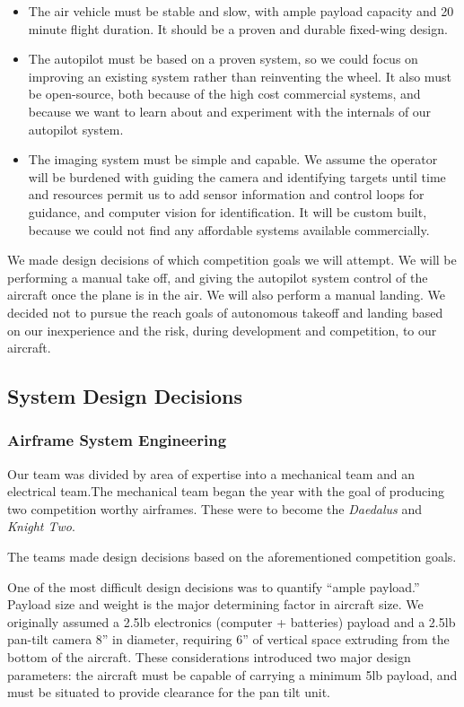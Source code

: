 \documentclass[10pt,twocolumns]{report}
\begin{document}
\begin{itemize}
	\item The air vehicle must be stable and slow, with ample payload capacity and 20 minute flight duration. It should be a proven and durable fixed-wing design.
	\item The autopilot must be based on a proven system, so we could focus on improving an existing system rather than reinventing the wheel. It also must be open-source, both because of the high cost commercial systems, and because we want to learn about and experiment with the internals of our autopilot system.
	\item The imaging system must be simple and capable. We assume the operator will be burdened with guiding the camera and identifying targets until time and resources permit us to add sensor information and control loops for guidance, and computer vision for identification. It will be custom built, because we could not find any affordable systems available commercially.
\end{itemize}

We made design decisions of which competition goals we will attempt. 
We will be performing a manual take off, and giving the autopilot system control of the aircraft once the plane is in the air. We will also perform a manual landing. We decided not to pursue the reach goals of autonomous takeoff and landing based on our inexperience and the risk, during development and competition, to our aircraft.
\subsection{System Design Decisions}
\subsubsection{Airframe System Engineering}

Our team was divided by area of expertise into a mechanical team and an electrical team.The mechanical team began the year with the goal of producing two competition worthy airframes. These were to become the \emph{Daedalus} and \emph{Knight Two}.

The teams made design decisions based on the aforementioned competition goals.

One of the most difficult design decisions was to quantify ``ample payload.'' Payload size and weight is the major determining factor in aircraft size.  We originally assumed a 2.5lb electronics (computer + batteries) payload and a 2.5lb pan-tilt camera 8'' in diameter, requiring 6'' of vertical space extruding from the bottom of the aircraft. These considerations introduced two major design parameters: the aircraft must be capable of carrying a minimum 5lb payload, and must be situated to provide clearance for the pan tilt unit.
\end{document}

